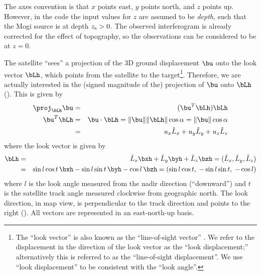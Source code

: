 \documentclass[11pt,titlepage,fleqn]{article}
\begin{document}
The axes convention is that $x$ points east, $y$ points north, and $z$ points up. However, in the code the input values for $z$ are assumed to be {\em depth}, such that the Mogi source is at depth $z_{\rm s} > 0$. The observed interferogram is already corrected for the effect of topography, so the observations can be considered to be at $z=0$. 

%



The satellite ``sees'' a projection of the 3D ground displacement $\bu$ onto the look vector $\bLh$, which points from the satellite to the target\footnote{The ``look vector'' is also known as the ``line-of-sight vector'' \citep[][Figure~10]{SimonsRosen2007}. We refer to the displacement in the direction of the look vector as the ``look displacement;'' alternatively this is referred to as the ``line-of-sight displacement''. We use ``look displacement'' to be consistent with the ``look angle''.}.
Therefore, we are actually interested in the (signed magnitude of the) projection of $\bu$ onto $\bLh$ (). This is given by
%
\begin{eqnarray}
\proj_{\bLh} \bu &=& (\bu^T\bLh)\bLh
\\
\bu^T\bLh &=& \bu \cdot \bLh = \|\bu\| \|\bLh\| \cos\alpha = \|\bu\| \cos\alpha 
\\
&=& u_x \hat{L}_x + u_y \hat{L}_y + u_z \hat{L}_z
\label{UL}
\end{eqnarray}
%
where the look vector is given by
%
\begin{eqnarray}
\bLh &=& \hat{L}_x \bxh + \hat{L}_y \byh + \hat{L}_z \bzh
= (\hat{L}_x, \hat{L}_y, \hat{L}_z)
\\
&=& \sin l \cos t\,\bxh -\sin l \sin t\,\byh -\cos l\,\bzh
= (\sin l \cos t,\; -\sin l \sin t,\;  -\cos l)
\label{L}
\end{eqnarray}
%
where $l$ is the look angle measured from the nadir direction (``downward'') and $t$ is the satellite track angle measured clockwise from geographic north. The look direction, in map view, is perpendicular to the track direction and points to the right (). All vectors are represented in an east-north-up basis.
\end{document}
